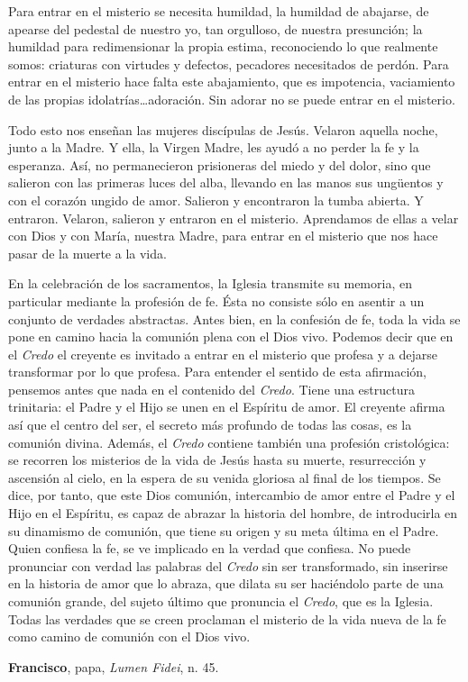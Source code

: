 \begin{body}
Para entrar en el misterio se necesita humildad, la humildad de abajarse, de apearse del pedestal de nuestro yo, tan orgulloso, de nuestra presunción; la humildad para redimensionar la propia estima, reconociendo lo que realmente somos: criaturas con virtudes y defectos, pecadores necesitados de perdón. Para entrar en el misterio hace falta este abajamiento, que es impotencia, vaciamiento de las propias idolatrías\ldots adoración. Sin adorar no se puede entrar en el misterio.

Todo esto nos enseñan las mujeres discípulas de Jesús. Velaron aquella noche, junto a la Madre. Y ella, la Virgen Madre, les ayudó a no perder la fe y la esperanza. Así, no permanecieron prisioneras del miedo y del dolor, sino que salieron con las primeras luces del alba, llevando en las manos sus ungüentos y con el corazón ungido de amor. Salieron y encontraron la tumba abierta. Y entraron. Velaron, salieron y entraron en el misterio. Aprendamos de ellas a velar con Dios y con María, nuestra Madre, para entrar en el misterio que nos hace pasar de la muerte a la vida.
\end{body}

\begin{patercite}
En la celebración de los sacramentos, la Iglesia transmite su memoria, en particular mediante la profesión de fe. Ésta no consiste sólo en asentir a un conjunto de verdades abstractas. Antes bien, en la confesión de fe, toda la vida se pone en camino hacia la comunión plena con el Dios vivo. Podemos decir que en el \textit{Credo} el creyente es invitado a entrar en el misterio que profesa y a dejarse transformar por lo que profesa. Para entender el sentido de esta afirmación, pensemos antes que nada en el contenido del \textit{Credo}. Tiene una estructura trinitaria: el Padre y el Hijo se unen en el Espíritu de amor. El creyente afirma así que el centro del ser, el secreto más profundo de todas las cosas, es la comunión divina. Además, el \textit{Credo} contiene también una profesión cristológica: se recorren los misterios de la vida de Jesús hasta su muerte, resurrección y ascensión al cielo, en la espera de su venida gloriosa al final de los tiempos. Se dice, por tanto, que este Dios comunión, intercambio de amor entre el Padre y el Hijo en el Espíritu, es capaz de abrazar la historia del hombre, de introducirla en su dinamismo de comunión, que tiene su origen y su meta última en el Padre. Quien confiesa la fe, se ve implicado en la verdad que confiesa. No puede pronunciar con verdad las palabras del \textit{Credo} sin ser transformado, sin inserirse en la historia de amor que lo abraza, que dilata su ser haciéndolo parte de una comunión grande, del sujeto último que pronuncia el \textit{Credo}, que es la Iglesia. Todas las verdades que se creen proclaman el misterio de la vida nueva de la fe como camino de comunión con el Dios vivo.
	
\textbf{Francisco}, papa, \textit{Lumen Fidei}, n. 45.
\end{patercite}

